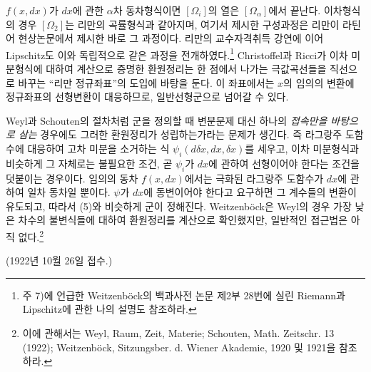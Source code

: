 $f(x,d x)$가 $d x$에 관한 $\alpha$차 동차형식이면 $[\Omega_i]$의 열은 $[\Omega_\alpha]$에서 끝난다. 이차형식의 경우 $[\Omega_2]$는 리만의 곡률형식과 같아지며, 여기서 제시한 구성과정은 리만이 라틴어 현상논문에서 제시한 바로 그 과정이다. 리만의 교수자격취득 강연에 이어 Lipschitz도 이와 독립적으로 같은 과정을 전개하였다.\footnote{주 7)에 언급한 Weitzenböck의 백과사전 논문 제2부 28번에 실린 Riemann과 Lipschitz에 관한 나의 설명도 참조하라.} Christoffel과 Ricci가 이차 미분형식에 대하여 계산으로 증명한 환원정리는 한 점에서 나가는 극값곡선들을 직선으로 바꾸는 ``리만 정규좌표''의 도입에 바탕을 둔다. 이 좌표에서는 $x$의 임의의 변환에 정규좌표의 선형변환이 대응하므로, 일반선형군으로 넘어갈 수 있다.

Weyl과 Schouten의 절차처럼 군을 정의할 때 변분문제 대신 하나의 \emph{접속만을 바탕으로 삼는} 경우에도 그러한 환원정리가 성립하는가라는 문제가 생긴다. 즉 라그랑주 도함수에 대응하여 고차 미분을 소거하는 식 $\psi_i(d\delta x,d x,\delta x)$를 세우고, 이차 미분형식과 비슷하게 그 자체로는 불필요한 조건, 곧 $\psi_i$가 $d x$에 관하여 선형이어야 한다는 조건을 덧붙이는 경우이다. 임의의 동차 $f(x,d x)$에서는 극화된 라그랑주 도함수가 $d x$에 관하여 일차 동차일 뿐이다. $\psi$가 $d x$에 동변이어야 한다고 요구하면 그 계수들의 변환이 유도되고, 따라서 (5)와 비슷하게 군이 정해진다. Weitzenböck은 Weyl의 경우 가장 낮은 차수의 불변식들에 대하여 환원정리를 계산으로 확인했지만, 일반적인 접근법은 아직 없다.\footnote{이에 관해서는 Weyl, Raum, Zeit, Materie; Schouten, Math. Zeitschr. 13 (1922); Weitzenböck, Sitzungsber. d. Wiener Akademie, 1920 및 1921을 참조하라.}

\begin{center}
(1922년 10월 26일 접수.)
\end{center}
\endgroup
